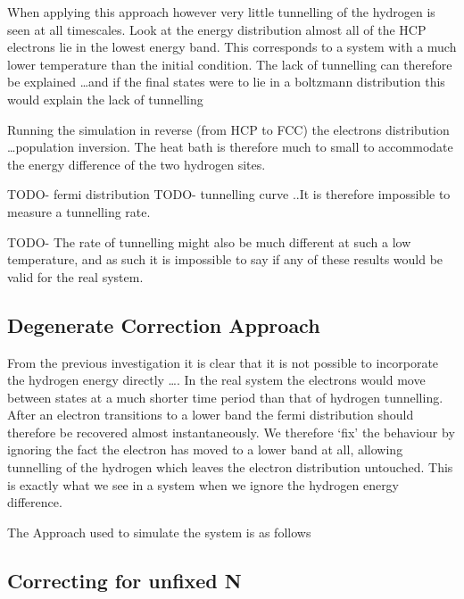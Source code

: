 When applying this approach however very
little tunnelling of the hydrogen is seen at all timescales.
Look at the energy distribution almost all
of the HCP electrons lie in the lowest energy band.
This corresponds to a system with a much lower
temperature than the initial condition.
The lack of tunnelling can therefore be explained
\ldots and if
the final states were to lie in a boltzmann  distribution
this would explain the lack of tunnelling

Running the simulation
in reverse (from HCP to FCC) the electrons
distribution \ldots population inversion.
The heat bath is therefore much to small
to accommodate the energy difference of
the two hydrogen sites.

TODO- fermi distribution
TODO- tunnelling curve
..It is therefore impossible to measure a tunnelling
rate.

TODO- The rate of tunnelling might also
be much different at such a low temperature,
and as such it is impossible to say if
any of these results would be valid
for the real system.

\subsection{Degenerate Correction Approach}
From the previous investigation it is clear
that it is not possible to incorporate the
hydrogen energy directly \ldots. In the
real system the electrons would move
between states at a much shorter time
period than that of hydrogen tunnelling.
After an electron transitions to a lower
band the fermi distribution should therefore
be recovered almost instantaneously. We
therefore `fix' the behaviour by
ignoring the fact the electron
has moved to a lower band at all,
allowing tunnelling of the hydrogen
which leaves the electron distribution
untouched. This is exactly what
we see in a system when we ignore
the hydrogen energy difference.


The Approach used to simulate the system is as follows

\subsection{Correcting for unfixed N}